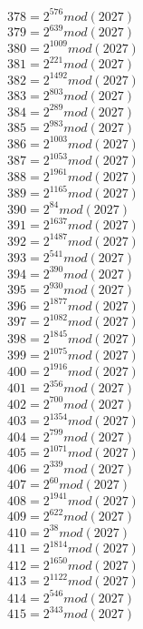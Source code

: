 \documentclass[12pt, letterpaper]{article}
\begin{document}
\begin{itemize}
\begin{multicols}{3}
$378= 2^{576} mod (2027)$\\
$379= 2^{639} mod (2027)$\\
$380= 2^{1009} mod (2027)$\\
$381= 2^{221} mod (2027)$\\
$382= 2^{1492} mod (2027)$\\
$383= 2^{803} mod (2027)$\\
$384= 2^{289} mod (2027)$\\
$385= 2^{983} mod (2027)$\\
$386= 2^{1003} mod (2027)$\\
$387= 2^{1053} mod (2027)$\\
$388= 2^{1961} mod (2027)$\\
$389= 2^{1165} mod (2027)$\\
$390= 2^{84} mod (2027)$\\
$391= 2^{1637} mod (2027)$\\
$392= 2^{1487} mod (2027)$\\
$393= 2^{541} mod (2027)$\\
$394= 2^{390} mod (2027)$\\
$395= 2^{930} mod (2027)$\\
$396= 2^{1877} mod (2027)$\\
$397= 2^{1082} mod (2027)$\\
$398= 2^{1845} mod (2027)$\\
$399= 2^{1075} mod (2027)$\\
$400= 2^{1916} mod (2027)$\\
$401= 2^{356} mod (2027)$\\
$402= 2^{700} mod (2027)$\\
$403= 2^{1354} mod (2027)$\\
$404= 2^{799} mod (2027)$\\
$405= 2^{1071} mod (2027)$\\
$406= 2^{339} mod (2027)$\\
$407= 2^{60} mod (2027)$\\
$408= 2^{1941} mod (2027)$\\
$409= 2^{622} mod (2027)$\\
$410= 2^{38} mod (2027)$\\
$411= 2^{1814} mod (2027)$\\
$412= 2^{1650} mod (2027)$\\
$413= 2^{1122} mod (2027)$\\
$414= 2^{546} mod (2027)$\\
$415= 2^{343} mod (2027)$\\

\end{multicols}
\end{itemize}
\end{document}
